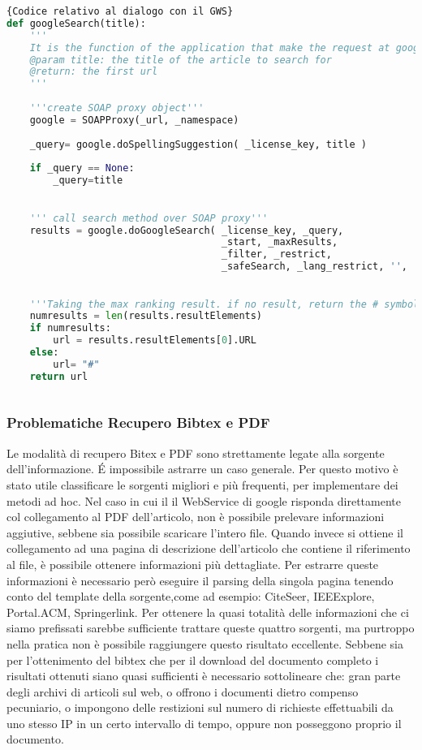 \begin{lstlisting}[language=Python,frame=r,caption=\textit{Codice relativo al dialogo con il GWS} ,breaklines=true,basicstyle=\scriptsize]{Codice relativo al dialogo con il GWS}
def googleSearch(title):
    '''
    It is the function of the application that make the request at google WS using SoapPY getting the first url of response.    
    @param title: the title of the article to search for
    @return: the first url
    '''
   
    '''create SOAP proxy object'''
    google = SOAPProxy(_url, _namespace)
    
    _query= google.doSpellingSuggestion( _license_key, title )
    
    if _query == None:
        _query=title

    
    ''' call search method over SOAP proxy'''
    results = google.doGoogleSearch( _license_key, _query, 
                                     _start, _maxResults, 
                                     _filter, _restrict,
                                     _safeSearch, _lang_restrict, '', '' )

    
    '''Taking the max ranking result. if no result, return the # symbol'''                                                       
    numresults = len(results.resultElements)
    if numresults:
        url = results.resultElements[0].URL
    else:
        url= "#"
    return url
    
\end{lstlisting}


\subsubsection{Problematiche Recupero Bibtex e PDF}
Le modalità di recupero Bitex e PDF sono strettamente legate alla sorgente dell'informazione. \'E impossibile astrarre un caso generale. Per questo motivo è stato utile classificare le sorgenti migliori e più frequenti, per implementare dei metodi ad hoc. Nel caso in cui il il WebService di google risponda direttamente col collegamento al PDF dell'articolo, non è possibile prelevare informazioni aggiutive, sebbene sia possibile scaricare l'intero file.
Quando invece si ottiene il collegamento ad una pagina di descrizione dell'articolo che contiene il riferimento al file, è possibile ottenere informazioni più dettagliate. Per estrarre queste informazioni è necessario però eseguire il parsing della singola pagina tenendo conto del template della sorgente,come ad esempio: CiteSeer, IEEExplore, Portal.ACM, Springerlink. 
Per ottenere la quasi totalità delle informazioni che ci siamo prefissati sarebbe sufficiente trattare queste quattro sorgenti, ma purtroppo nella pratica non è possibile raggiungere questo risultato eccellente. Sebbene sia per l'ottenimento del bibtex che per il download del documento completo i risultati ottenuti siano quasi sufficienti è necessario sottolineare che: gran parte degli archivi di articoli sul web, o offrono i documenti dietro compenso pecuniario, o impongono delle restizioni sul numero di richieste effettuabili da uno stesso IP in un certo intervallo di tempo, oppure non posseggono proprio il documento.
